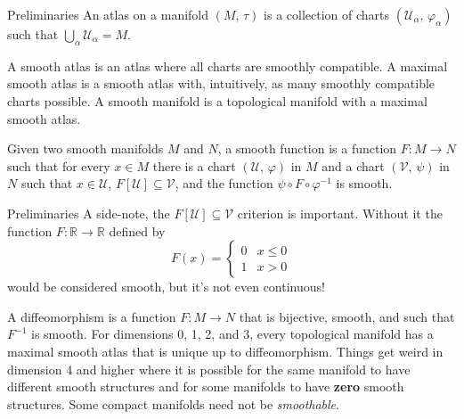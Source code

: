 \documentclass{beamer}
\begin{document}
    \begin{frame}{Preliminaries}
        An atlas on a manifold $(M,\,\tau)$ is a collection of charts
        $(\mathcal{U}_{\alpha},\,\varphi_{\alpha})$ such that
        $\bigcup_{\alpha}\mathcal{U}_{\alpha}=M$.
        \par\hfill\par
        A smooth atlas is an atlas where all charts are smoothly compatible.
        A maximal smooth atlas is a smooth atlas with, intuitively, as many
        smoothly compatible charts possible. A smooth manifold is a topological
        manifold with a maximal smooth atlas.
        \par\hfill\par
        Given two smooth manifolds $M$ and $N$, a smooth function is a function
        $F:M\rightarrow{N}$ such that for every $x\in{M}$ there is a chart
        $(\mathcal{U},\,\varphi)$ in $M$ and a chart $(\mathcal{V},\,\psi)$ in
        $N$ such that $x\in\mathcal{U}$, $F[\mathcal{U}]\subseteq\mathcal{V}$,
        and the function $\psi\circ{F}\circ\varphi^{-1}$ is smooth.
    \end{frame}
    \begin{frame}{Preliminaries}
        A side-note,
        the $F[\mathcal{U}]\subseteq\mathcal{V}$ criterion is important.
        Without it the function $F:\mathbb{R}\rightarrow\mathbb{R}$
        defined by
        \begin{equation}
            F(x)=
            \begin{cases}
                0&x\leq{0}\\
                1&x>0
            \end{cases}
        \end{equation}
        would be considered smooth, but it's not even continuous!
        \par\hfill\par
        A diffeomorphism is a function $F:M\rightarrow{N}$ that is bijective,
        smooth, and such that $F^{-1}$ is smooth.
        For dimensions 0, 1, 2, and 3, every topological manifold has a
        maximal smooth atlas that is unique up to diffeomorphism. Things get
        weird in dimension 4 and higher where it is possible for the same
        manifold to have different smooth structures and for some manifolds to
        have \textbf{zero} smooth structures. Some compact manifolds need not
        be \textit{smoothable}.
    \end{frame}
\end{document}
